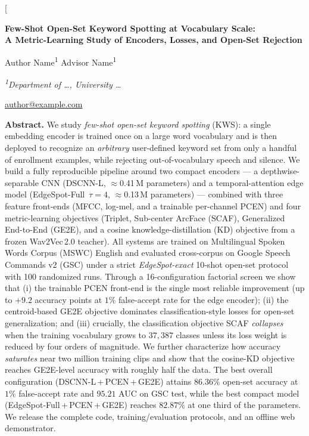 \documentclass[10pt,twocolumn]{article}
\newcommand{\best}[1]{\textbf{#1}}
\begin{document}
\twocolumn[
\begin{@twocolumnfalse}
\begin{center}
{\LARGE\bfseries Few-Shot Open-Set Keyword Spotting at Vocabulary Scale:\\[2pt]
A Metric-Learning Study of Encoders, Losses, and Open-Set Rejection\par}
\vspace{8pt}
{\large Author Name\textsuperscript{1} \quad Advisor Name\textsuperscript{1}\par}
\vspace{4pt}
{\itshape \textsuperscript{1}Department of \dots, University \dots\par}
\vspace{4pt}
{\small \href{mailto:author@example.com}{author@example.com}\par}
\vspace{12pt}

\begin{minipage}{0.92\textwidth}
\small
\textbf{Abstract.}
We study \emph{few-shot open-set keyword spotting} (KWS): a single embedding
encoder is trained once on a large word vocabulary and is then deployed to
recognize an \emph{arbitrary} user-defined keyword set from only a handful of
enrollment examples, while rejecting out-of-vocabulary speech and silence. We
build a fully reproducible pipeline around two compact encoders --- a
depthwise-separable CNN (DSCNN-L, $\approx$0.41\,M parameters) and a temporal-attention
edge model (EdgeSpot-Full~$\tau{=}4$, $\approx$0.13\,M parameters) --- combined with three
feature front-ends (MFCC, log-mel, and a trainable per-channel PCEN) and four
metric-learning objectives (Triplet, Sub-center ArcFace (SCAF), Generalized
End-to-End (GE2E), and a cosine knowledge-distillation (KD) objective from a
frozen Wav2Vec\,2.0 teacher). All systems are trained on Multilingual Spoken
Words Corpus (MSWC) English and evaluated cross-corpus on Google Speech Commands
v2 (GSC) under a strict \emph{EdgeSpot-exact} 10-shot open-set protocol with 100
randomized runs. Through a 16-configuration factorial screen we show that
(i) the trainable PCEN front-end is the single most reliable improvement
(up to $+9.2$ accuracy points at $1\%$ false-accept rate for the edge encoder);
(ii) the centroid-based GE2E objective dominates classification-style losses for
open-set generalization; and (iii) crucially, the classification objective SCAF
\emph{collapses} when the training vocabulary grows to $37{,}387$ classes
unless its loss weight is reduced by four orders of magnitude. We further
characterize how accuracy \emph{saturates} near two million training clips and
show that the cosine-KD objective reaches GE2E-level accuracy with roughly half
the data. The best overall configuration (DSCNN-L\,+\,PCEN\,+\,GE2E) attains
\best{$86.36\%$} open-set accuracy at $1\%$ false-accept rate and \best{$95.21$}
AUC on GSC test, while the best compact model (EdgeSpot-Full\,+\,PCEN\,+\,GE2E)
reaches $82.87\%$ at one third of the parameters. We release the complete code,
training/evaluation protocols, and an offline web demonstrator.


\end{minipage}
\end{center}
\end{@twocolumnfalse}
\end{document}
